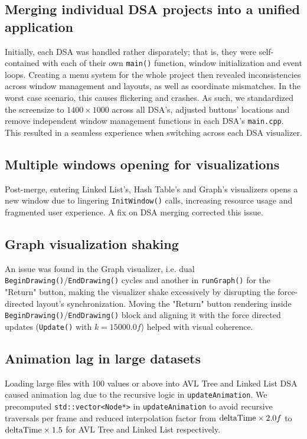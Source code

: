 \documentclass{article}
\begin{document}
\subsection{Merging individual DSA projects into a unified application}
Initially, each DSA was handled rather disparately; that is, they were self-contained with each of their own \lstinline|main()| function, window initialization and event loops. Creating a menu system for the whole project then revealed inconsistencies across window management and layouts, as well as coordinate mismatches. In the worst case scenario, this causes flickering and crashes. As such, we standardized the screensize to $1400\times1000$ across all DSA's, adjusted buttons' locations and remove independent window management functions in each DSA's \lstinline|main.cpp|. This resulted in a seamless experience when switching across each DSA visualizer.

\subsection{Multiple windows opening for visualizations}
Post-merge, entering Linked List's, Hash Table's and Graph's visualizers opens a new window due to lingering \lstinline|InitWindow()| calls, increasing resource usage and fragmented user experience. A fix on DSA merging corrected this issue.

\subsection{Graph visualization shaking}
An issue was found in the Graph visualizer, i.e. dual \lstinline|BeginDrawing()|/\lstinline|EndDrawing()| cycles and another in \lstinline|runGraph()| for the "Return" button, making the visualizer shake excessively by disrupting the force-directed layout's synchronization. Moving the "Return" button rendering inside \lstinline|BeginDrawing()|/\lstinline|EndDrawing()| block and aligning it with the force directed updates (\lstinline|Update()| with $k = 15000.0f$) helped with visual coherence.

\subsection{Animation lag in large datasets}
Loading large files with 100 values or above into AVL Tree and Linked List DSA caused animation lag due to the recursive logic in \lstinline|updateAnimation|. We precomputed \lstinline|std::vector<Node*>| in \lstinline|updateAnimation| to avoid recursive traversals per frame and reduced interpolation factor from $\text{\lstinline|deltaTime|}\times2.0f$ to $\text{\lstinline|deltaTime|}\times1.5$ for AVL Tree and Linked List respectively.
\end{document}
